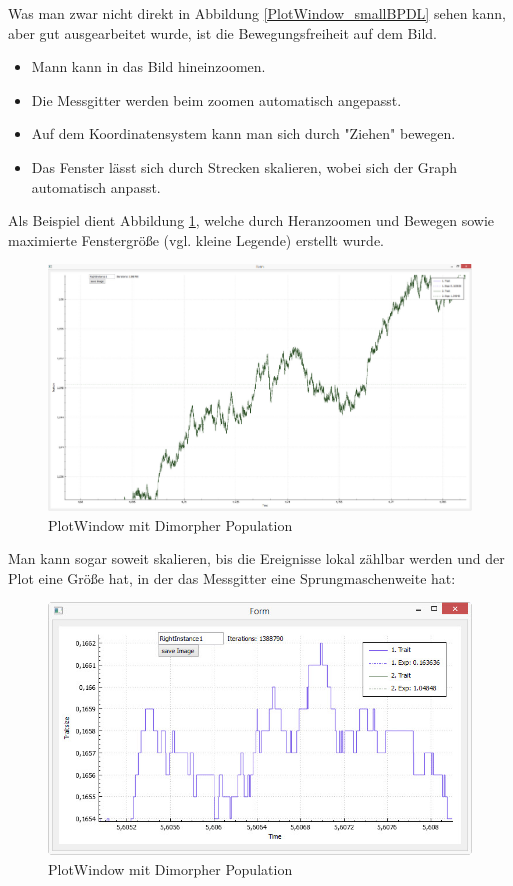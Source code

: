 \documentclass[11pt, a4paper, german]{article}
\theoremstyle{plain}
\begin{document}
	Was man zwar nicht direkt in Abbildung \ref{PlotWindow_smallBPDL} sehen kann, aber gut ausgearbeitet wurde, ist die Bewegungsfreiheit auf dem Bild.\\
	\begin{itemize}
		\item Mann kann in das Bild hineinzoomen.
		\item Die Messgitter werden beim zoomen automatisch angepasst.
		\item Auf dem Koordinatensystem kann man sich durch "{}Ziehen"{} bewegen.
		\item Das Fenster lässt sich durch Strecken skalieren, wobei sich der Graph automatisch anpasst.
	\end{itemize}
	Als Beispiel dient Abbildung \ref{PlotWindow_zoomedBPDLmaximized}, welche durch Heranzoomen und Bewegen sowie maximierte Fenstergröße (vgl. kleine Legende) erstellt wurde.
	\begin{figure}[H]
		\centering
		\includegraphics[width=1\linewidth]{./Pictures/PlotWindow_zoomedBPDLmaximized}
		\caption[PlotWindow]{PlotWindow mit Dimorpher Population}
		\label{PlotWindow_zoomedBPDLmaximized}
	\end{figure}
	Man kann sogar soweit skalieren, bis die Ereignisse lokal zählbar werden und der Plot eine Größe hat, in der das Messgitter eine Sprungmaschenweite hat:
	\begin{figure}[H]
		\centering
		\includegraphics[width=1\linewidth]{./Pictures/PlotWindow_zoomedBPDL_Stepview}
		\caption[PlotWindow]{PlotWindow mit Dimorpher Population}
		\label{PlotWindow_zoomedBPDL_Stepview}
	\end{figure}	
	
\end{document}
